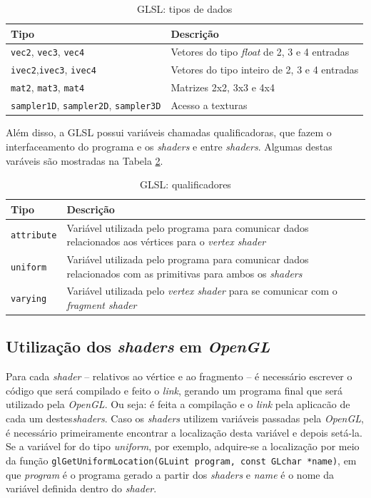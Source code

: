 \begin{table}[ht]
	\centering	
	\begin{tabularx}{0.9\textwidth}{lX}
		\toprule
		\textbf{Tipo} & \textbf{Descrição}  \\
		\midrule
		\texttt{vec2}, \texttt{vec3}, \texttt{vec4} & Vetores do tipo \textit{float} de 2, 3 e 4 entradas \\
		\texttt{ivec2},\texttt{ivec3}, \texttt{ivec4} & Vetores do tipo inteiro de 2, 3 e 4 entradas \\
		\texttt{mat2}, \texttt{mat3}, \texttt{mat4} & Matrizes 2x2, 3x3 e 4x4 \\
		\texttt{sampler1D}, \texttt{sampler2D}, \texttt{sampler3D} & Acesso a texturas \\
		\bottomrule
	\end{tabularx}
	\caption{ GLSL: tipos de dados}
	\label{tiposglsl}
\end{table}

	Além disso, a GLSL possui variáveis chamadas qualificadoras, que fazem o interfaceamento do programa e os \textit{shaders} e entre \textit{shaders}. Algumas destas varáveis são mostradas na Tabela \ref{tiposqualificadores}.

	\begin{table}[ht]
	\centering	
	\begin{tabularx}{0.9\textwidth}{lX}
		\toprule
		\textbf{Tipo} & \textbf{Descrição}  \\
		\midrule
		\texttt{attribute} &  Variável utilizada pelo programa para comunicar dados relacionados aos vértices para o \textit{vertex shader}\\
		\texttt{uniform} &  Variável utilizada pelo programa para comunicar dados relacionados com as primitivas para ambos os \textit{shaders} \\
		\texttt{varying} &  Variável utilizada pelo \textit{vertex shader} para se comunicar com o \textit{fragment shader} \\
		\bottomrule
	\end{tabularx}
	\caption{ GLSL: qualificadores}
	\label{tiposqualificadores}
	\end{table}

\subsection{Utilização dos \textit{shaders} em \textit{OpenGL}}

	Para cada \textit{shader} -- relativos ao vértice e ao fragmento -- é necessário escrever o código que será compilado e feito o \textit{link}, gerando um programa final que será utilizado pela \textit{OpenGL}. Ou seja: é feita a compilação e o \textit{link} pela aplicacão de cada um destes\textit{shaders}. Caso os \textit{shaders} utilizem variáveis passadas pela \textit{OpenGL}, é necessário primeiramente encontrar a localização desta variável e depois setá-la. Se a variável for do tipo \textit{uniform}, por exemplo, adquire-se a localização por meio da função \texttt{glGetUniformLocation(GLuint program, const GLchar *name)}, em que \textit{program} é o programa gerado a partir dos \textit{shaders} e \textit{name} é o nome da variável definida dentro do \textit{shader}. 

